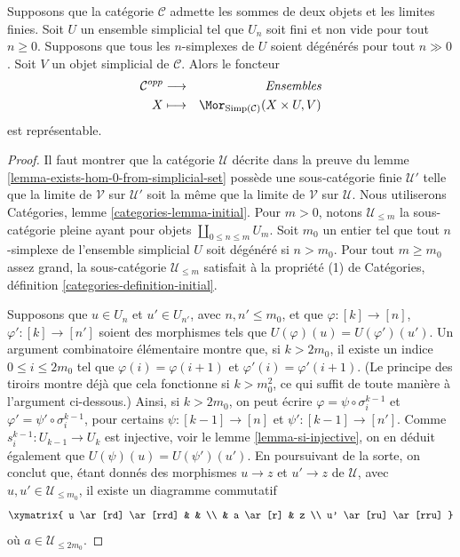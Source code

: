 \begin{lemma}
\label{lemma-exists-hom-0-from-simplicial-set-finite}
Supposons que la catégorie $\mathcal{C}$ admette les sommes de deux objets
et les limites finies. Soit $U$ un ensemble simplicial tel que $U_n$ soit
fini et non vide pour tout $n \geq 0$. Supposons que tous les
$n$-simplexes de $U$ soient dégénérés pour tout $n \gg 0$.
Soit $V$ un objet simplicial de $\mathcal{C}$. Alors le foncteur
\begin{eqnarray*}
\mathcal{C}^{opp} & \longrightarrow & \textit{Ensembles} \\
X
& \longmapsto &
\Mor_{\text{Simp}(\mathcal{C})}(X \times U, V)
\end{eqnarray*}
est représentable.
\end{lemma}

\begin{proof}
Il faut montrer que la catégorie $\mathcal{U}$ décrite dans la preuve du
lemme \ref{lemma-exists-hom-0-from-simplicial-set} possède une
sous-catégorie finie $\mathcal{U}'$ telle que la limite de $\mathcal{V}$
sur $\mathcal{U}'$ soit la même que la limite de $\mathcal{V}$ sur
$\mathcal{U}$.
Nous utiliserons Catégories, lemme \ref{categories-lemma-initial}.
Pour $m > 0$, notons $\mathcal{U}_{\leq m}$ la sous-catégorie pleine ayant
pour objets $\coprod_{0 \leq n \leq m} U_m$. Soit $m_0$ un entier tel que
tout $n$-simplexe de l'ensemble simplicial $U$ soit dégénéré si $n > m_0$.
Pour tout $m \geq m_0$ assez grand, la sous-catégorie
$\mathcal{U}_{\leq m}$ satisfait à la propriété (1) de Catégories,
définition \ref{categories-definition-initial}.

\medskip\noindent
Supposons que $u \in U_n$ et
$u' \in U_{n'}$, avec $n, n' \leq m_0$, et que
$\varphi : [k] \to [n]$, $\varphi' : [k] \to [n']$
soient des morphismes tels que $U(\varphi)(u) = U(\varphi')(u')$.
Un argument combinatoire élémentaire montre que, si $k > 2m_0$,
il existe un indice $0 \leq i \leq 2m_0$ tel que
$\varphi(i) =\varphi(i + 1)$ et $\varphi'(i) = \varphi'(i + 1)$.
(Le principe des tiroirs montre déjà que cela fonctionne si
$k > m_0^2$, ce qui suffit de toute manière à l'argument ci-dessous.)
Ainsi, si $k > 2m_0$, on peut écrire
$\varphi = \psi \circ \sigma^{k - 1}_i$ et
$\varphi' = \psi' \circ \sigma^{k - 1}_i$, pour certains
$\psi : [k - 1] \to [n]$ et $\psi' : [k - 1] \to [n']$.
Comme $s^{k - 1}_i : U_{k - 1} \to U_k$ est injective,
voir le lemme \ref{lemma-si-injective}, on en déduit également que
$U(\psi)(u) = U(\psi')(u')$. En poursuivant de la sorte,
on conclut que, étant donnés des morphismes
$u \to z$ et $u' \to z$ de $\mathcal{U}$,
avec $u, u' \in \mathcal{U}_{\leq m_0}$, il existe
un diagramme commutatif
$$
\xymatrix{
u \ar[rd] \ar[rrd] & & \\
& a \ar[r] & z \\
u' \ar[ru] \ar[rru]
}
$$
où $a \in \mathcal{U}_{\leq 2m_0}$.


\end{proof}
